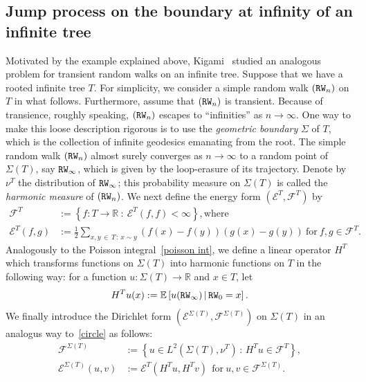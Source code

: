 \documentclass[10pt]{amsart}
\theoremstyle{definition}\newtheorem{defi}[theo]{Definition}\newtheorem{rema}[theo]{Remark}\newtheorem{exam}[theo]{Example}\newtheorem{exem}[theo]{Example}\newtheorem{nota}[theo]{Notation}
\newcommand{\ce}{\mathcal{E}}
\newcommand{\cf}{\mathcal{F}}
\newcommand{\br}{\mathbb{R}}
\newcommand{\be}{\mathbb{E}}
\begin{document}
\subsection*{Jump process on the boundary at infinity of an infinite tree}
Motivated by the example explained above, Kigami~\cite{Ki} studied an analogous problem for transient random walks on an infinite tree. Suppose that we have a rooted infinite tree $T$. For simplicity, we consider a simple random walk $({\tt RW}_n)$ on $T$ in what follows. Furthermore, assume that $({\tt RW}_n)$ is transient. Because of transience, roughly speaking, $({\tt RW}_n)$ escapes to ``infinities'' as $n\to\infty$. One way to make this loose description rigorous is to use the \emph{geometric boundary} $\Sigma$ of $T$, which is the collection of infinite geodesics emanating from the root. The simple random walk $({\tt RW}_n)$ almost surely converges as $n\to\infty$ to a random point of $\Sigma(T)$, say ${\tt RW}_\infty$, which is given by the loop-erasure of its trajectory. Denote by $\nu^T$ the distribution of ${\tt RW}_{\infty}$; this probability measure on $\Sigma(T)$ is called the \emph{harmonic measure} of $({\tt RW}_n)$. We next define the energy form $(\ce^T,\cf^T)$ by
\begin{align*}
\cf^T&:=\left\{f:T\to\br\ :\ \ce^T(f,f)<\infty\right\}, \text{where}\\
\ce^T(f,g)&:=\frac{1}{2}\sum_{x,y\,\in\,T\,:\,x\sim y}(f(x)-f(y))(g(x)-g(y))\ \text{for}\ f,g\in\cf^T.
\end{align*}
Analogously to the Poisson integral~\eqref{poisson int}, we define a linear operator $H^T$ which transforms functions on $\Sigma(T)$ into harmonic functions on $T$ in the following way: for a function $u:\Sigma(T)\to
\br$ and $x\in T$, let
\begin{equation}\label{HAR-EX}
H^Tu(x):=\be\left[u({\tt RW}_{\infty})\,\middle|\,{\tt RW}_0=x\right].
\end{equation}
We finally introduce the Dirichlet form $(\ce^{\Sigma(T)},
\cf^{\Sigma(T)})$ on $\Sigma(T)$ in an analogus way to~\eqref{circle} as follows:
\begin{equation}\label{tree}
\begin{split}
\cf^{\Sigma(T)}&:=\left\{u\in L^2\left(\Sigma(T),\nu^T\right)\,:\, H^Tu\in \cf^T\right\},\\
\ce^{\Sigma(T)}(u,v)&:=\ce^{T}\left(H^{T}u,H^{T}v\right)\ \ \text{for}\ u,v\in\cf^{\Sigma(T)}.
\end{split}
\end{equation}
\end{document}
